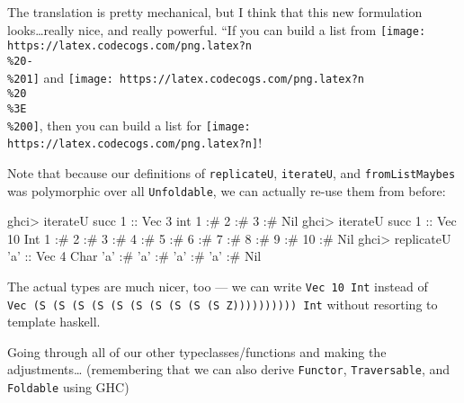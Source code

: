 \documentclass[]{article}
\newenvironment{Shaded}{\begin{snugshade}}{\end{snugshade}}
\newcommand{\CharTok}[1]{\textcolor[rgb]{0.31,0.60,0.02}{#1}}
\newcommand{\DataTypeTok}[1]{\textcolor[rgb]{0.13,0.29,0.53}{#1}}
\newcommand{\DecValTok}[1]{\textcolor[rgb]{0.00,0.00,0.81}{#1}}
\newcommand{\FunctionTok}[1]{\textcolor[rgb]{0.00,0.00,0.00}{#1}}
\newcommand{\NormalTok}[1]{#1}
\newcommand{\OtherTok}[1]{\textcolor[rgb]{0.56,0.35,0.01}{#1}}
\begin{document}
The translation is pretty mechanical, but I think that this new formulation
looks\ldots{}really nice, and really powerful. ``If you can build a list from
\texttt{[image: https://latex.codecogs.com/png.latex?n\\\%20-\\\%201]} and
\texttt{[image: https://latex.codecogs.com/png.latex?n\\\%20\\\%3E\\\%200]}, then you
can build a list for \texttt{[image: https://latex.codecogs.com/png.latex?n]}!

Note that because our definitions of \texttt{replicateU}, \texttt{iterateU}, and
\texttt{fromListMaybes} was polymorphic over all \texttt{Unfoldable}, we can
actually re-use them from before:

\begin{Shaded}
\begin{Highlighting}[]
\NormalTok{ghci}\FunctionTok{>}\NormalTok{ iterateU succ }\DecValTok{1}\OtherTok{ ::} \DataTypeTok{Vec} \DecValTok{3}\NormalTok{ int}
\DecValTok{1} \FunctionTok{:#} \DecValTok{2} \FunctionTok{:#} \DecValTok{3} \FunctionTok{:#} \DataTypeTok{Nil}
\NormalTok{ghci}\FunctionTok{>}\NormalTok{ iterateU succ }\DecValTok{1}\OtherTok{ ::} \DataTypeTok{Vec} \DecValTok{10} \DataTypeTok{Int}
\DecValTok{1} \FunctionTok{:#} \DecValTok{2} \FunctionTok{:#} \DecValTok{3} \FunctionTok{:#} \DecValTok{4} \FunctionTok{:#} \DecValTok{5} \FunctionTok{:#} \DecValTok{6} \FunctionTok{:#} \DecValTok{7} \FunctionTok{:#} \DecValTok{8} \FunctionTok{:#} \DecValTok{9} \FunctionTok{:#} \DecValTok{10} \FunctionTok{:#} \DataTypeTok{Nil}
\NormalTok{ghci}\FunctionTok{>}\NormalTok{ replicateU }\CharTok{'a'}\OtherTok{ ::} \DataTypeTok{Vec} \DecValTok{4} \DataTypeTok{Char}
\CharTok{'a'} \FunctionTok{:#} \CharTok{'a'} \FunctionTok{:#} \CharTok{'a'} \FunctionTok{:#} \CharTok{'a'} \FunctionTok{:#} \DataTypeTok{Nil}
\end{Highlighting}
\end{Shaded}

The actual types are much nicer, too --- we can write \texttt{Vec\ 10\ Int}
instead of
\texttt{Vec\ (S\ (S\ (S\ (S\ (S\ (S\ (S\ (S\ (S\ (S\ Z))))))))))\ Int} without
resorting to template haskell.

Going through all of our other typeclasses/functions and making the
adjustments\ldots{} (remembering that we can also derive \texttt{Functor},
\texttt{Traversable}, and \texttt{Foldable} using GHC)
\end{document}
